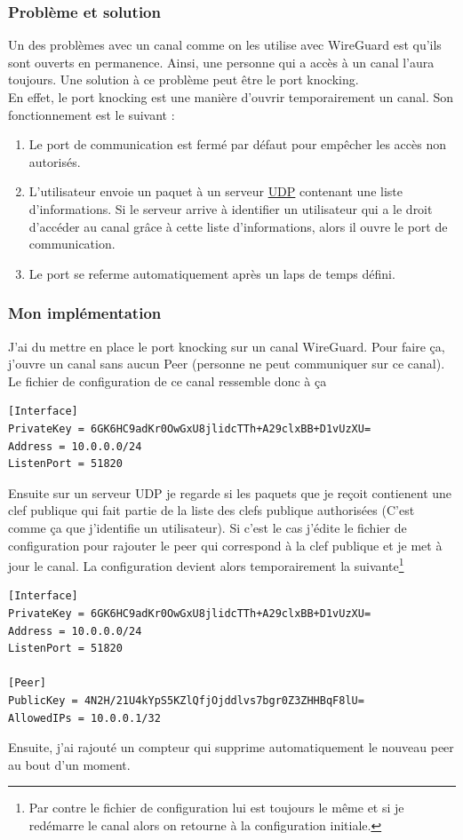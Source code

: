 \documentclass[a4paper, 12pt]{article}
\begin{document}
\subsubsection{Problème et solution}

Un des problèmes avec un canal comme on les utilise avec WireGuard est qu'ils sont ouverts en permanence. Ainsi, une personne qui a accès à un canal l'aura toujours. Une solution à ce problème peut être le port knocking. \\
En effet, le port knocking est une manière d'ouvrir temporairement un canal. Son fonctionnement est le suivant :

\begin{enumerate}
\item Le port de communication est fermé par défaut pour empêcher les accès non autorisés.
\item L'utilisateur envoie un paquet à un serveur \hyperref[UDP]{UDP} contenant une liste d'informations. Si le serveur arrive à identifier un utilisateur qui a le droit d'accéder au canal grâce à cette liste d'informations, alors il ouvre le port de communication.
\item Le port se referme automatiquement après un laps de temps défini.
\end{enumerate}
\subsubsection{Mon implémentation}
J'ai du mettre en place le port knocking sur un canal WireGuard. Pour faire ça, j'ouvre un canal sans aucun Peer (personne ne peut communiquer sur ce canal). Le fichier de configuration de ce canal ressemble donc à ça 
\begin{lstlisting}[language = shell]
[Interface]
PrivateKey = 6GK6HC9adKr0OwGxU8jlidcTTh+A29clxBB+D1vUzXU= 
Address = 10.0.0.0/24
ListenPort = 51820
\end{lstlisting}
Ensuite sur un serveur UDP je regarde si les paquets que je reçoit contienent une clef publique qui fait partie de la liste des clefs publique authorisées (C'est comme ça que j'identifie un utilisateur). Si c'est le cas j'édite le fichier de configuration pour rajouter le peer qui correspond à la clef publique et je met à jour le canal. La configuration devient alors temporairement la suivante\footnote{Par contre le fichier de configuration lui est toujours le même et si je redémarre le canal alors on retourne à la configuration initiale.}
\begin{lstlisting}[language = shell]
[Interface]
PrivateKey = 6GK6HC9adKr0OwGxU8jlidcTTh+A29clxBB+D1vUzXU= 
Address = 10.0.0.0/24
ListenPort = 51820

[Peer]
PublicKey = 4N2H/21U4kYpS5KZlQfjOjddlvs7bgr0Z3ZHHBqF8lU=
AllowedIPs = 10.0.0.1/32
\end{lstlisting}
Ensuite, j'ai rajouté un compteur qui supprime automatiquement le nouveau peer au bout d'un moment. \\
\end{document}
